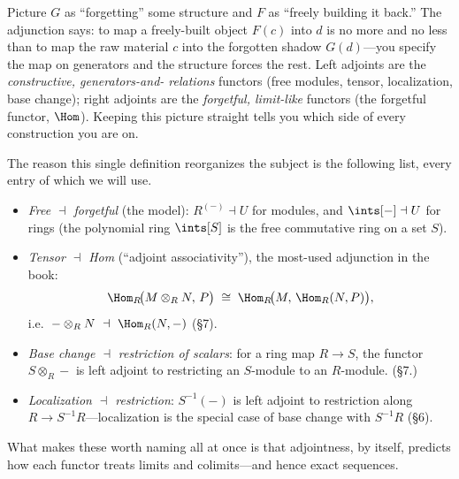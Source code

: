\documentclass[11pt]{article}
\begin{document}
\begin{iintuition}
Picture $G$ as ``forgetting'' some structure and $F$ as ``freely building it back.'' The
adjunction says: to map a freely-built object $F(c)$ into $d$ is no more and no less than to
map the raw material $c$ into the forgotten shadow $G(d)$---you specify the map on generators
and the structure forces the rest. Left adjoints are the \emph{constructive, generators-and-
relations} functors (free modules, tensor, localization, base change); right adjoints are the
\emph{forgetful, limit-like} functors (the forgetful functor, $\Hom$). Keeping this picture
straight tells you which side of every construction you are on.
\end{iintuition}

The reason this single definition reorganizes the subject is the following list, every entry
of which we will use.

\begin{eexample}
\begin{itemize}\setlength{\itemsep}{3pt}
\item \emph{Free $\dashv$ forgetful} (the model): $R^{(-)}\dashv U$ for modules, and
$\ints[-]\dashv U$ for rings (the polynomial ring $\ints[S]$ is the free commutative ring on a
set $S$).
\item \emph{Tensor $\dashv$ Hom} (``adjoint associativity''), the most-used adjunction in the
book:
\[
\Hom_R\!\big(M\otimes_R N,\,P\big)\;\cong\;\Hom_R\!\big(M,\,\Hom_R(N,P)\big),
\]
i.e.\ $-\otimes_R N\ \dashv\ \Hom_R(N,-)$ (\S7).
\item \emph{Base change $\dashv$ restriction of scalars}: for a ring map $R\to S$, the
functor $S\otimes_R-$ is left adjoint to restricting an $S$-module to an $R$-module. (\S7.)
\item \emph{Localization $\dashv$ restriction}: $S^{-1}(-)$ is left adjoint to restriction
along $R\to S^{-1}R$---localization is the special case of base change with $S^{-1}R$ (\S6).
\end{itemize}
\end{eexample}

What makes these worth naming all at once is that adjointness, by itself, predicts how each
functor treats limits and colimits---and hence exact sequences.
\end{document}
